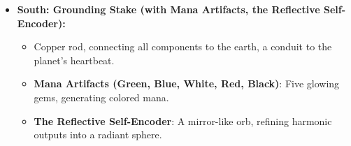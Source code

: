 \begin{itemize}
\begin{itemize}
    \end{itemize}
    \item \texttt{} \textbf{South: Grounding Stake (with Mana Artifacts, the Reflective Self-Encoder):}
    \begin{itemize}
        \item \texttt{} Copper rod, connecting all components to the earth, a conduit to the planet's heartbeat.
        \item \texttt{} \textbf{Mana Artifacts (Green, Blue, White, Red, Black)}: Five glowing gems, generating colored mana.
        \item \texttt{} \textbf{The Reflective Self-Encoder}: A mirror-like orb, refining harmonic outputs into a radiant sphere.
    \end{itemize}
\end{itemize}

